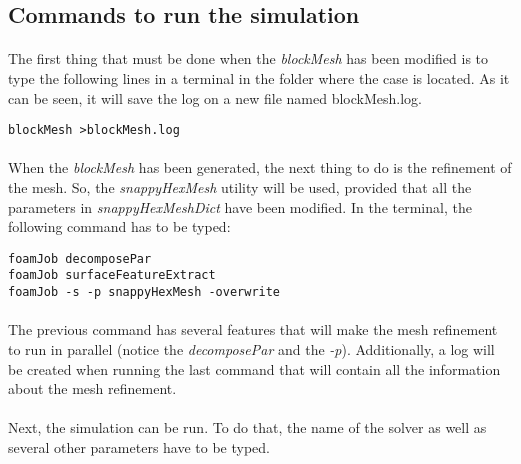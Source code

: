 \subsection{Commands to run the simulation}

\paragraph{}The first thing that must be done when the \textit{blockMesh} has been modified is to type the following lines in a terminal in the folder where the case is located. As it can be seen, it will save the log on a new file named blockMesh.log.

\begin{center}
\texttt{blockMesh >blockMesh.log}
\end{center}

\paragraph{}When the \textit{blockMesh} has been generated, the next thing to do is the refinement of the mesh. So, the \textit{snappyHexMesh} utility will be used, provided that all the parameters in \textit{snappyHexMeshDict} have been modified. In the terminal, the following command has to be typed:

\begin{center}
\texttt{foamJob decomposePar \\
foamJob surfaceFeatureExtract \\
foamJob -s -p snappyHexMesh -overwrite}
\end{center}

\paragraph{}The previous command has several features that will make the mesh refinement to run in parallel (notice the \textit{decomposePar} and the \textit{-p}). Additionally, a log will be created when running the last command that will contain all the information about the mesh refinement.

\paragraph{}Next, the simulation can be run. To do that, the name of the solver as well as several other parameters have to be typed.
